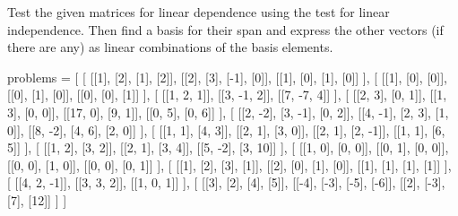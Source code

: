 \documentclass[letterpaper]{article}
\newenvironment{question}[2][Question]{\begin{trivlist}
\item[\hskip \labelsep {\bfseries #1}\hskip \labelsep {\bfseries #2.}]}{\end{trivlist}}
\begin{document}
\begin{question}{2.1}
    Test the given matrices for linear dependence using the test for linear 
    independence. Then find a basis for their span and express the other vectors 
    (if there are any) as linear combinations of the basis elements.

\begin{pycode}

problems = [
    [
        [[1], [2], [1], [2]],
        [[2], [3], [-1], [0]],
        [[1], [0], [1], [0]]
    ],
    [
        [[1], [0], [0]],
        [[0], [1], [0]],
        [[0], [0], [1]]
    ],
    [
        [[1, 2, 1]],
        [[3, -1, 2]],
        [[7, -7, 4]]
    ],
    [
        [[2, 3], [0, 1]],
        [[1, 3], [0, 0]],
        [[17, 0], [9, 1]],
        [[0, 5], [0, 6]]
    ],
    [
        [[2, -2], [3, -1], [0, 2]],
        [[4, -1], [2, 3], [1, 0]],
        [[8, -2], [4, 6], [2, 0]]
    ],
    [
        [[1, 1], [4, 3]],
        [[2, 1], [3, 0]],
        [[2, 1], [2, -1]],
        [[1, 1], [6, 5]]
    ],
    [
        [[1, 2], [3, 2]],
        [[2, 1], [3, 4]],
        [[5, -2], [3, 10]]
    ],
    [
        [[1, 0], [0, 0]],
        [[0, 1], [0, 0]],
        [[0, 0], [1, 0]],
        [[0, 0], [0, 1]]
    ],
    [
        [[1], [2], [3], [1]],
        [[2], [0], [1], [0]],
        [[1], [1], [1], [1]]
    ],
    [
        [[4, 2, -1]],
        [[3, 3, 2]],
        [[1, 0, 1]]
    ],
    [
        [[3], [2], [4], [5]],
        [[-4], [-3], [-5], [-6]],
        [[2], [-3], [7], [12]]
    ]
]

\end{pycode}


\end{question}
\end{document}
